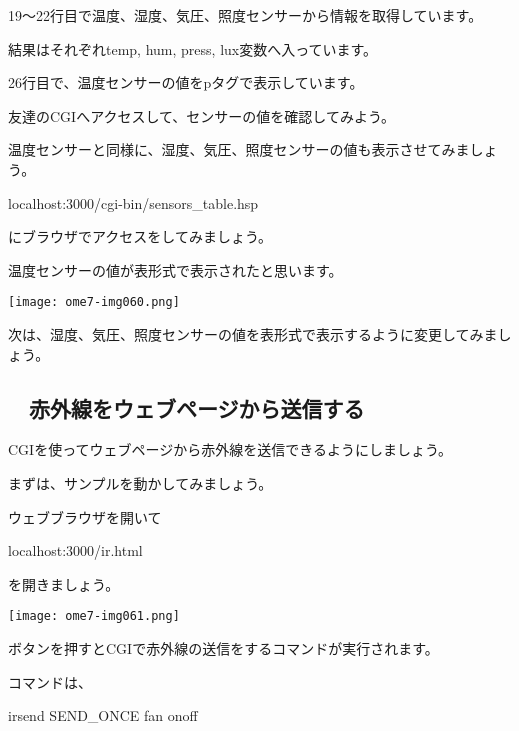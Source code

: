 19～22行目で温度、湿度、気圧、照度センサーから情報を取得しています。

結果はそれぞれtemp, hum, press,
lux変数へ入っています。

26行目で、温度センサーの値をpタグで表示しています。

\clearpage
{}\theQuestion\label{Q:sensors}

友達のCGIへアクセスして、センサーの値を確認してみよう。

温度センサーと同様に、湿度、気圧、照度センサーの値も表示させてみましょう。

\begin{center}
	\begin{boxedminipage}{0.5\textwidth}
		localhost:3000/cgi-bin/sensors\_table.hsp
	\end{boxedminipage}
\end{center}

にブラウザでアクセスをしてみましょう。

温度センサーの値が表形式で表示されたと思います。

%

\centering
\texttt{[image: ome7-img060.png]}
\flushleft

次は、湿度、気圧、照度センサーの値を表形式で表示するように変更してみましょう。

\clearpage
\subsection*{\theExercise　赤外線をウェブページから送信する}
\addtocounter{Exercise}{-1}\label{E:IR}
CGIを使ってウェブページから赤外線を送信できるようにしましょう。

まずは、サンプルを動かしてみましょう。

ウェブブラウザを開いて

localhost:3000/ir.html

を開きましょう。

%
%

\centering
\texttt{[image: ome7-img061.png]}
\flushleft

ボタンを押すとCGIで赤外線の送信をするコマンドが実行されます。

コマンドは、

irsend SEND\_ONCE fan onoff

